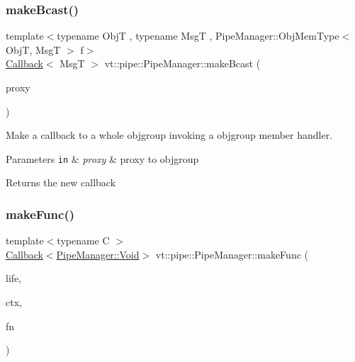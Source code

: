 \subsubsection{\texorpdfstring{make\+Bcast()}{makeBcast()}\hspace{0.1cm}{\footnotesize\ttfamily [6/6]}}
{\footnotesize\ttfamily template$<$typename ObjT , typename MsgT , Pipe\+Manager\+::\+Obj\+Mem\+Type$<$ Obj\+T, Msg\+T $>$ f$>$ \\
\hyperlink{namespacevt_a36db99df4c973d48b1118a293fff533f}{Callback}$<$ MsgT $>$ vt\+::pipe\+::\+Pipe\+Manager\+::make\+Bcast (\begin{DoxyParamCaption}\item[{\hyperlink{structvt_1_1objgroup_1_1proxy_1_1_proxy}{objgroup\+::proxy\+::\+Proxy}$<$ ObjT $>$}]{proxy }\end{DoxyParamCaption})}



Make a callback to a whole objgroup invoking a objgroup member handler. 


\begin{DoxyParams}[1]{Parameters}
\mbox{\tt in}  & {\em proxy} & proxy to objgroup\\
\hline
\end{DoxyParams}
\begin{DoxyReturn}{Returns}
the new callback 
\end{DoxyReturn}
\mbox{\label{structvt_1_1pipe_1_1_pipe_manager_a51d552105b29056f146fecab880eb6c4}} 
\subsubsection{\texorpdfstring{make\+Func()}{makeFunc()}\hspace{0.1cm}{\footnotesize\ttfamily [1/6]}}
{\footnotesize\ttfamily template$<$typename C $>$ \\
\hyperlink{namespacevt_a36db99df4c973d48b1118a293fff533f}{Callback}$<$\hyperlink{structvt_1_1pipe_1_1_pipe_manager_ab720c2580ecfd3ab36e49aeaaff64cc6}{Pipe\+Manager\+::\+Void}$>$ vt\+::pipe\+::\+Pipe\+Manager\+::make\+Func (\begin{DoxyParamCaption}\item[{\hyperlink{namespacevt_1_1pipe_acb42b284378c0fdac1d7c6335dc26f58}{Lifetime\+Enum}}]{life,  }\item[{C $\ast$}]{ctx,  }\item[{\hyperlink{structvt_1_1pipe_1_1_pipe_manager_base_ad8463823b6b4cfdb67c119d6d22e3bac}{Func\+Ctx\+Type}$<$ C $>$}]{fn }\end{DoxyParamCaption})}

